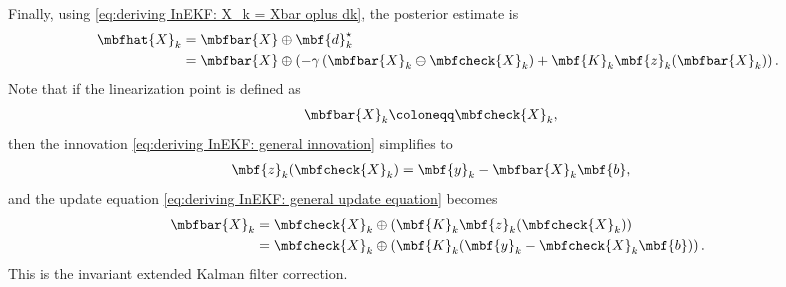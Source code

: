 Finally, using \eqref{eq:deriving InEKF: X_k = Xbar oplus dk}, the posterior estimate is 
\begin{align}
    \mbfhat{X}_{k}
    &= \mbfbar{X}\oplus\mbf{d}_{k}^{\star}\\
    \label{eq:deriving InEKF: general update equation}
    &= \mbfbar{X}\oplus\left(-\gamma\left( \mbfbar{X}_{k}\ominus\mbfcheck{X}_{k} \right) + \mbf{K}_{k}\mbf{z}_{k}(\mbfbar{X}_{k})\right).
\end{align}
Note that if the linearization point is defined as
\begin{align}
    \mbfbar{X}_{k} &\coloneqq \mbfcheck{X}_{k}, 
\end{align}
then 
the innovation \eqref{eq:deriving InEKF: general innovation} simplifies to
\begin{align}
    \mbf{z}_{k}(\mbfcheck{X}_{k}) &= \mbf{y}_{k} - \mbfbar{X}_{k}\mbf{b},
\end{align}
and the update equation \eqref{eq:deriving InEKF: general update equation} becomes
\begin{align}
    \mbfbar{X}_{k} &= \mbfcheck{X}_{k}\oplus\left( \mbf{K}_{k}\mbf{z}_{k}(\mbfcheck{X}_{k}) \right)\\
    &= \mbfcheck{X}_{k}\oplus\left( \mbf{K}_{k}(\mbf{y}_{k} - \mbfcheck{X}_{k}\mbf{b}) \right).
\end{align}
This is the invariant extended Kalman filter correction.
